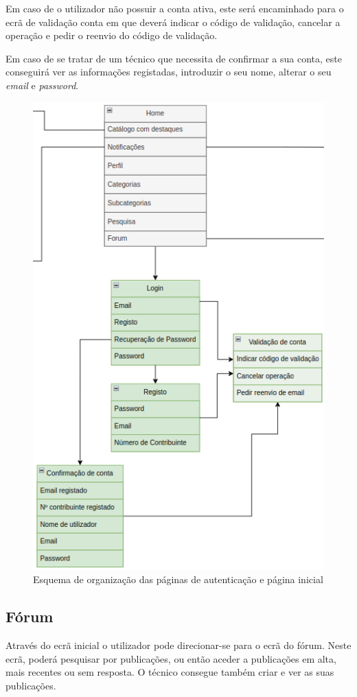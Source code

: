 Em caso de o utilizador não possuir a conta ativa, este será encaminhado para o ecrã de validação conta em que deverá indicar o código de validação, cancelar a operação e pedir o reenvio do código de validação.

Em caso de se tratar de um técnico que necessita de confirmar a sua conta, este conseguirá ver as informações registadas, introduzir o seu nome, alterar o seu \textit{email} e \textit{password}.

\begin{figure}[htb]
    \centering
    \includegraphics[height=0.9\textwidth]{images/Arquiteturas/superficial_de_app/home_auth.png}
    \caption{Esquema de organização das páginas de autenticação e página inicial}
    \label{fig:4}
\end{figure}

\newpage

\subsection{Fórum}

Através do ecrã inicial o utilizador pode direcionar-se para o ecrã do fórum. Neste ecrã, poderá pesquisar por publicações, ou então aceder a publicações em alta, mais recentes ou sem resposta.
O técnico consegue também criar e ver as suas publicações.

